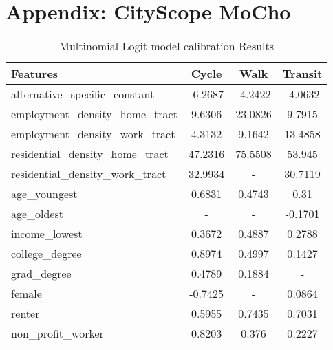 \section{Appendix: CityScope MoCho}
 {
  \begin{table}[h]
      \begin{center}
          \caption{Multinomial Logit model calibration Results}\label{appendix:mocho-tab-results}
          \begin{tabular}{l|c c c}
              \hline
              \textbf{Features}                 & \textbf{Cycle} & \textbf{Walk} & \textbf{Transit} \\
              \hline
              alternative\_specific\_constant   & -6.2687        & -4.2422       & -4.0632          \\
              employment\_density\_home\_tract  & 9.6306         & 23.0826       & 9.7915           \\
              employment\_density\_work\_tract  & 4.3132         & 9.1642        & 13.4858          \\
              residential\_density\_home\_tract & 47.2316        & 75.5508       & 53.945           \\
              residential\_density\_work\_tract & 32.9934        & -             & 30.7119          \\
              age\_youngest                     & 0.6831         & 0.4743        & 0.31             \\
              age\_oldest                       & -              & -             & -0.1701          \\
              income\_lowest                    & 0.3672         & 0.4887        & 0.2788           \\
              college\_degree                   & 0.8974         & 0.4997        & 0.1427           \\
              grad\_degree                      & 0.4789         & 0.1884        & -                \\
              female                            & -0.7425        & -             & 0.0864           \\
              renter                            & 0.5955         & 0.7435        & 0.7031           \\
              non\_profit\_worker               & 0.8203         & 0.376         & 0.2227           \\

\end{tabular}
\end{center}
\end{table}}
